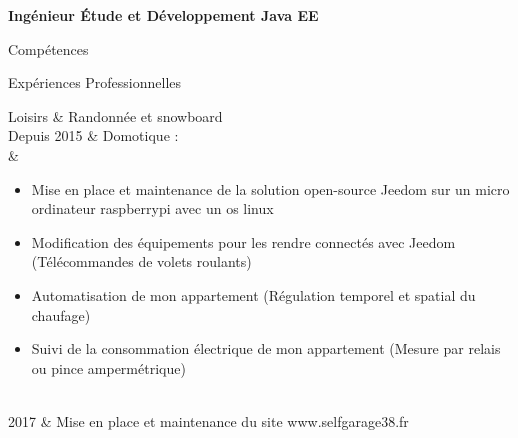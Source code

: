 \vspace{0.2cm}

\begin{center}
	\textbf{\huge{Ingénieur Étude et Développement Java EE}}
\end{center}

\vspace{0.2cm}

\begin{rubriquetableau}[\firstcolumnwidth]{Compétences}
	
	
\end{rubriquetableau}

\begin{rubriquetableau}[\firstcolumnwidth]{Expériences Professionnelles}
    
    
    \newpage
    
    
    
    
    
    
    
\end{rubriquetableau}



\begin{rubriquetableau}[\firstcolumnwidth]{Loisirs}
			& Randonnée et snowboard\\
Depuis 2015 & Domotique :\\
			& \begin{itemize}
				\item Mise en place et maintenance de la solution open-source Jeedom sur un micro ordinateur raspberrypi avec un os linux
				\item Modification des équipements pour les rendre connectés avec Jeedom (Télécommandes de volets roulants)
				\item Automatisation de mon appartement (Régulation temporel et spatial du chaufage)
				\item Suivi de la consommation électrique de mon appartement (Mesure par relais ou pince ampermétrique)
			\end{itemize}\\
2017        & Mise en place et maintenance du site www.selfgarage38.fr
\end{rubriquetableau}
